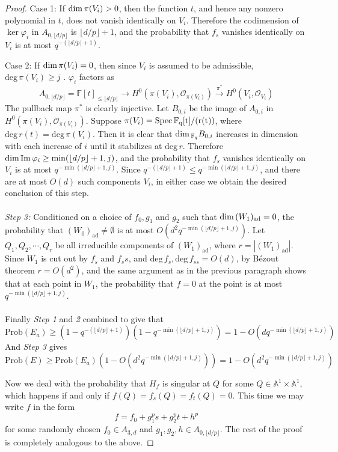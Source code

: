 \documentclass[12pt]{article}
\theoremstyle{plain}
\theoremstyle{definition}
\newcommand{\IA}{\mathbb{A}}
\newcommand{\IF}{\mathbb{F}}
\newcommand{\sO}{\mathcal{O}}
\renewcommand{\deg}{\mathrm{deg}\,}
\newcommand{\Spec}{\rm Spec\,}
\renewcommand\dim{{\rm dim\,}}
\newcommand{\im}{{\rm Im\,}}
\newcommand{\<}{\langle}
\renewcommand{\>}{\rangle}
\newcommand{\Prob}{\mathrm{Prob}}
\begin{document}
\begin{proof}
Case 1: If $\dim \pi(V_i) > 0$, then the function $t$, and hence any nonzero polynomial in $t$, does not vanish identically on $V_i$. Therefore the codimension of $\ker \varphi_i$ in $A_{0, \lfloor d/p \rfloor}$ is $\lfloor d/p \rfloor + 1$, and the probability that $f_s$ vanishes identically on $V_i$ is at most $q^{- (\lfloor d/p \rfloor + 1)}$.   

Case 2: If $\dim \pi(V_i) = 0$, then since $V_i$ is assumed to be admissible,  $\deg \pi(V_i) \ge j$ . $\varphi_i$ factors as $$A_{0, \lfloor d/p \rfloor} = \IF[t]_{\le \lfloor d/p \rfloor} \to H^0(\pi(V_i), \sO_{\pi(V_i)}) \stackrel{\pi^*}{\to} H^0(V_i, \sO_{V_i})$$ The pullback map $\pi^*$ is clearly injective. Let $B_{0, i}$ be the image of $A_{0, i}$ in $H^0(\pi(V_i), \sO_{\pi(V_i)})$. Suppose $\pi(V_i) = \Spec \IF_q[t]/(r(t))$, where $\deg r(t) = \deg \pi(V_i)$. Then it is clear that $\dim_{\IF_q} B_{0, i}$ increases in dimension with each increase of $i$ until it stabilizes at $\deg r$. Therefore $\dim \im \varphi_i \ge \min(\lfloor d/p \rfloor + 1, j)$, and the probability that $f_s$ vanishes identically on $V_i$ is at most $q^{- \min(\lfloor d/p \rfloor + 1, j)}$.   
Since $q^{- (\lfloor d/p \rfloor + 1)} \le q^{- \min(\lfloor d/p \rfloor + 1, j)}$, and there are at most $O(d)$ such components $V_i$, in either case we obtain the desired conclusion of this step. \\\\
\textit{Step 3: }Conditioned on a choice of $f_0, g_1$ and $g_2$ such that $\dim (W_1)_{\mathrm{ad}} = 0$, the probability that $(W_0)_{\mathrm{ad}} \neq \emptyset$ is at most $O(d^2 q^{- \min(\lfloor d/p \rfloor + 1, j)})$. Let $Q_1, Q_2, \cdots, Q_r$ be all irreducible components of $(W_1)_{\mathrm{ad}}$, where $r = |(W_1)_{\mathrm{ad}}|$. Since $W_1$ is cut out by $f_s$ and $f_ss$, and $\deg f_s, \deg f_{ss} = O(d)$, by B{\'e}zout theorem $r = O(d^2)$, and the same argument as in the previous paragraph shows that at each point in $W_1$, the probability that $f = 0$ at the point is at most $q^{- \min(\lfloor d/p \rfloor + 1, j)}$. \\\\
Finally \textit{Step 1} and \textit{2} combined to give that 
$$ \Prob(E_a) \ge (1 - q^{- (\lfloor d/p \rfloor + 1)})(1- q^{- \min(\lfloor d/p \rfloor + 1, j)}) = 1 - O(d q^{- \min(\lfloor d/p \rfloor + 1, j)}) $$
And \textit{Step 3} gives 
$$ \Prob(E) \ge \Prob(E_a)(1 - O(d^2 q^{- \min(\lfloor d/p \rfloor + 1, j)})) = 1 - O(d^2 q^{- \min(\lfloor d/p \rfloor + 1, j)}) $$

Now we deal with the probability that $H_f$ is singular at $Q$ for some $Q \in \IA^1 \times \IA^1$, which happens if and only if $f(Q) = f_s(Q) = f_t(Q) = 0$. This time we may write $f$ in the form 
$$ f = f_0 + g_1^p s + g_2^p t + h^p $$
for some randomly chosen $f_0 \in A_{3, d}$ and $g_1, g_2, h \in A_{0, \lfloor d/p \rfloor}$. The rest of the proof is completely analogous to the above. 
\end{proof}
\end{document}
